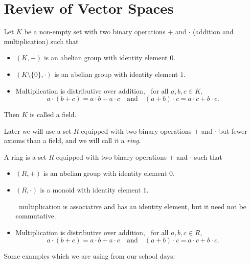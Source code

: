 
\section{Review of Vector Spaces}

\begin{definition}
    Let \(K\) be a non-empty set with two binary operations \(+\) and \(\cdot\) (addition and multiplication) such that
    \begin{itemize}
        \item \((K, +)\) is an abelian group with identity element \(0\).
        \item \((K \setminus \{0\}, \cdot)\) is an abelian group with identity element \(1\).
        \item Multiplication is distributive over addition, \ie\ for all \(a, b, c \in K\),
              \begin{equation}
                  a \cdot (b + c) = a \cdot b + a \cdot c \quad \text{and} \quad (a + b) \cdot c = a \cdot c + b \cdot c.
              \end{equation}
    \end{itemize}
    Then \(K\) is called a field.
\end{definition}
Later we will use a set \(R\) equipped with two binary operations \(+\) and \(\cdot\) but fewer axioms than a field, and we will call it a \emph{ring}.
\begin{definition}[Ring]
    A ring is a set \(R\) equipped with two binary operations \(+\) and \(\cdot\) such that
    \begin{itemize}
        \item \((R, +)\) is an abelian group with identity element \(0\).
        \item \((R, \cdot)\) is a monoid with identity element \(1\).

              \ie\ multiplication is associative and has an identity element, but it need not be commutative.
        \item Multiplication is distributive over addition, \ie\ for all \(a, b, c \in R\),
              \begin{equation}
                  a \cdot (b + c) = a \cdot b + a \cdot c \quad \text{and} \quad (a + b) \cdot c = a \cdot c + b \cdot c.
              \end{equation}
    \end{itemize}
\end{definition}
Some examples which we are using from our school days:
